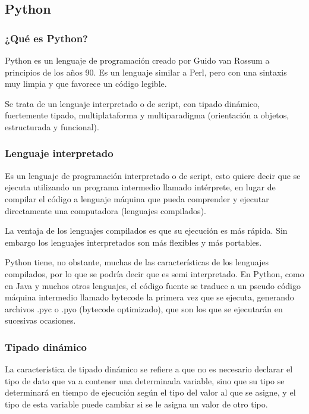 \documentclass[12pt,legalpaper]{report}
\begin{document}
		\subsection{Python}

			\subsubsection{¿Qué es Python?}

Python es un lenguaje de programación creado por Guido van Rossum a principios de los años 90.  Es un lenguaje similar a Perl, pero con una sintaxis muy limpia y que favorece un código legible.

Se trata de un lenguaje interpretado o de script, con tipado dinámico, fuertemente tipado, multiplataforma y multiparadigma (orientación a objetos, estructurada y funcional).

			\subsubsection{Lenguaje interpretado}

Es un lenguaje de programación interpretado o de script, esto quiere decir que se ejecuta utilizando un programa intermedio llamado intérprete, en lugar de compilar el código a lenguaje máquina que pueda comprender y ejecutar directamente una computadora (lenguajes compilados).

La ventaja de los lenguajes compilados es que su ejecución es más rápida. Sin embargo los lenguajes interpretados son más flexibles y más portables.

Python tiene, no obstante, muchas de las características de los lenguajes compilados, por lo que se podría decir que es semi interpretado. En Python, como en Java y muchos otros lenguajes, el código fuente se
traduce a un pseudo código máquina intermedio llamado bytecode la primera vez que se ejecuta, generando archivos .pyc o .pyo (bytecode optimizado), que son los que se ejecutarán en sucesivas ocasiones.


			\subsubsection{Tipado dinámico}

La característica de tipado dinámico se refiere a que no es necesario declarar el tipo de dato que va a contener una determinada variable, sino que su tipo se determinará en tiempo de ejecución según el tipo del valor al que se asigne, y el tipo de esta variable puede cambiar si se le asigna un valor de otro tipo.
\end{document}
